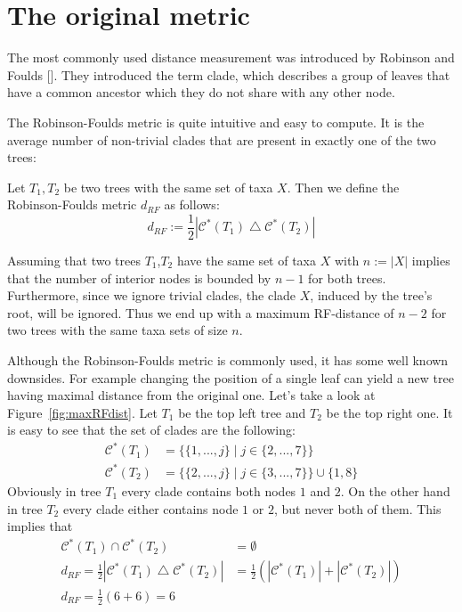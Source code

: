 \section{The original metric}
The most commonly used distance measurement was introduced by Robinson and Foulds []. They introduced the term clade, which describes a group of leaves that have a common ancestor which they do not share with any other node.

The Robinson-Foulds metric is quite intuitive and easy to compute. It is the average number of non-trivial clades that are present in exactly one of the two trees:
\begin{defin}
Let $T_1,T_2$ be two trees with the same set of taxa $X$. Then we define the Robinson-Foulds metric $d_{RF}$ as follows:
\[ d_{RF} := \frac{1}{2}|\mathcal{C}^*(T_1) \bigtriangleup \mathcal{C}^*(T_2)| \]
\end{defin}
\begin{rem}
Assuming that two trees $T_1$,$T_2$ have the same set of taxa $X$ with $n:= |X|$ implies that the number of interior nodes is bounded by $n-1$ for both trees. Furthermore, since we ignore trivial clades, the clade $X$, induced by the tree's root, will be ignored. Thus we end up with a maximum RF-distance of $n-2$ for two trees with the same taxa sets of size $n$.
\end{rem}
Although the Robinson-Foulds metric is commonly used, it has some well known downsides. For example changing the position of a single leaf can yield a new tree having maximal distance from the original one. Let's take a look at Figure~\ref{fig:maxRFdist}. Let $T_1$ be the top left tree and $T_2$ be the top right one. It is easy to see that the set of clades are the following:
\begin{align*}
\mathcal{C}^*(T_1) &=\{ \{1,...,j\}\;|\;j\in \{2,...,7\}\} \\
\mathcal{C}^*(T_2) &=\{ \{2,...,j\}\;|\;j\in \{3,...,7\}\} \cup \{1,8\}
\end{align*}
Obviously in tree $T_1$ every clade contains both nodes $1$ and $2$. On the other hand in tree $T_2$ every clade either contains node $1$ or $2$, but never both of them. This implies that 
\begin{align*}
\mathcal{C}^*(T_1) \cap \mathcal{C}^*(T_2) &= \emptyset \\
d_{RF} = \frac{1}{2}|\mathcal{C}^*(T_1) \bigtriangleup \mathcal{C}^*(T_2)| &= \frac{1}{2}(|\mathcal{C}^*(T_1)| + |\mathcal{C}^*(T_2)|) \\
d_{RF} = \frac{1}{2}(6 + 6) = 6
\end{align*}
